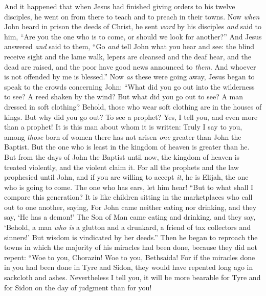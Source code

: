 \begin{biblechapter} %
 And it happened that when Jesus had finished giving orders to his twelve disciples, he went on from there to teach and to preach in their towns.
\verse Now \textit{when} John heard in prison the deeds of Christ, he sent \textit{word} by his disciples
\verse \textit{and} said to him, “Are you the one who is to come, or should we look for another?”
\verse And Jesus answered \textit{and} said to them, “Go \textit{and} tell John what you hear and see:
\verse the blind receive sight and the lame walk, lepers are cleansed and the deaf hear, and the dead are raised, and the poor have good news announced to \textit{them}.
\verse And whoever is not offended by me is blessed.”
\verse Now \textit{as} these were going away, Jesus began to speak to the crowds concerning John: “What did you go out into the wilderness to see? A reed shaken by the wind?
\verse But what did you go out to see? A man dressed in soft clothing? Behold, those who wear soft clothing are in the houses of kings.
\verse But why did you go out? To see a prophet? Yes, I tell you, and even more than a prophet!
\verse It is this man about whom it is written:
\verse Truly I say to you, among \textit{those} born of women there has not arisen \textit{one} greater than John the Baptist. But the one who is least in the kingdom of heaven is greater than he.
\verse But from the days of John the Baptist until now, the kingdom of heaven is treated violently, and the violent claim it.
\verse For all the prophets and the law prophesied until John,
\verse and if you are willing to accept \textit{it}, he is Elijah, the one who is going to come.
\verse The one who has ears, let him hear!
\verse “But to what shall I compare this generation? It is like children sitting in the marketplaces who call out to one another,
\verse saying,
\verse For John came neither eating nor drinking, and they say, ‘He has a demon!’
\verse The Son of Man came eating and drinking, and they say, ‘Behold, a man \textit{who is} a glutton and a drunkard, a friend of tax collectors and sinners!’ But wisdom is vindicated by her deeds.”
 Then he began to reproach the towns in which the majority of his miracles had been done, because they did not repent:
\verse “Woe to you, Chorazin! Woe to you, Bethsaida! For if the miracles done in you had been done in Tyre and Sidon, they would have repented long ago in sackcloth and ashes.
\verse Nevertheless I tell you, it will be more bearable for Tyre and for Sidon on the day of judgment than for you!

\end{biblechapter}
